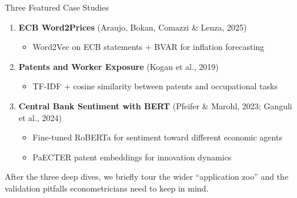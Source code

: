 \documentclass[10pt,english,aspectratio=169]{beamer}
\begin{document}
\begin{frame}{Three Featured Case Studies}
\begin{enumerate}
\item \textbf{ECB Word2Prices} (Araujo, Bokan, Comazzi \& Lenza, 2025)
   \begin{itemize}
       \item Word2Vec on ECB statements + BVAR for inflation forecasting
   \end{itemize}

\medskip
\item \textbf{Patents and Worker Exposure} (Kogan et al., 2019)
   \begin{itemize}
       \item TF-IDF + cosine similarity between patents and occupational tasks
   \end{itemize}

\medskip
\item \textbf{Central Bank Sentiment with BERT} (Pfeifer \& Marohl, 2023; Ganguli et al., 2024)
   \begin{itemize}
       \item Fine-tuned RoBERTa for sentiment toward different economic agents
       \item PaECTER patent embeddings for innovation dynamics
   \end{itemize}
\end{enumerate}

\medskip
After the three deep dives, we briefly tour the wider ``application zoo'' and the validation pitfalls econometricians need to keep in mind.
\end{frame}
\end{document}
